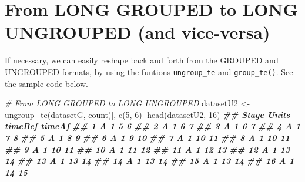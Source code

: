 \documentclass[
]{book}
\newenvironment{Shaded}{\begin{snugshade}}{\end{snugshade}}
\newcommand{\CommentTok}[1]{\textcolor[rgb]{0.56,0.35,0.01}{\textit{#1}}}
\newcommand{\DecValTok}[1]{\textcolor[rgb]{0.00,0.00,0.81}{#1}}
\newcommand{\DocumentationTok}[1]{\textcolor[rgb]{0.56,0.35,0.01}{\textbf{\textit{#1}}}}
\newcommand{\FunctionTok}[1]{\textcolor[rgb]{0.00,0.00,0.00}{#1}}
\newcommand{\NormalTok}[1]{#1}
\newcommand{\OtherTok}[1]{\textcolor[rgb]{0.56,0.35,0.01}{#1}}
\newcommand{\SpecialCharTok}[1]{\textcolor[rgb]{0.00,0.00,0.00}{#1}}
\begin{document}
\hypertarget{from-long-grouped-to-long-ungrouped-and-vice-versa}{%
\section{From LONG GROUPED to LONG UNGROUPED (and vice-versa)}\label{from-long-grouped-to-long-ungrouped-and-vice-versa}}

If necessary, we can easily reshape back and forth from the GROUPED and UNGROUPED formats, by using the funtions \texttt{ungroup\_te} and \texttt{group\_te()}. See the sample code below.

\begin{Shaded}
\begin{Highlighting}[]
\CommentTok{\# From LONG GROUPED to LONG UNGROUPED}
\NormalTok{datasetU2 }\OtherTok{\textless{}{-}} \FunctionTok{ungroup\_te}\NormalTok{(datasetG, count)[,}\SpecialCharTok{{-}}\FunctionTok{c}\NormalTok{(}\DecValTok{5}\NormalTok{, }\DecValTok{6}\NormalTok{)]}
\FunctionTok{head}\NormalTok{(datasetU2, }\DecValTok{16}\NormalTok{)}
\DocumentationTok{\#\#    Stage Units timeBef timeAf}
\DocumentationTok{\#\# 1      A     1       5      6}
\DocumentationTok{\#\# 2      A     1       6      7}
\DocumentationTok{\#\# 3      A     1       6      7}
\DocumentationTok{\#\# 4      A     1       7      8}
\DocumentationTok{\#\# 5      A     1       8      9}
\DocumentationTok{\#\# 6      A     1       9     10}
\DocumentationTok{\#\# 7      A     1      10     11}
\DocumentationTok{\#\# 8      A     1      10     11}
\DocumentationTok{\#\# 9      A     1      10     11}
\DocumentationTok{\#\# 10     A     1      11     12}
\DocumentationTok{\#\# 11     A     1      12     13}
\DocumentationTok{\#\# 12     A     1      13     14}
\DocumentationTok{\#\# 13     A     1      13     14}
\DocumentationTok{\#\# 14     A     1      13     14}
\DocumentationTok{\#\# 15     A     1      13     14}
\DocumentationTok{\#\# 16     A     1      14     15}
\end{Highlighting}
\end{Shaded}
\end{document}

